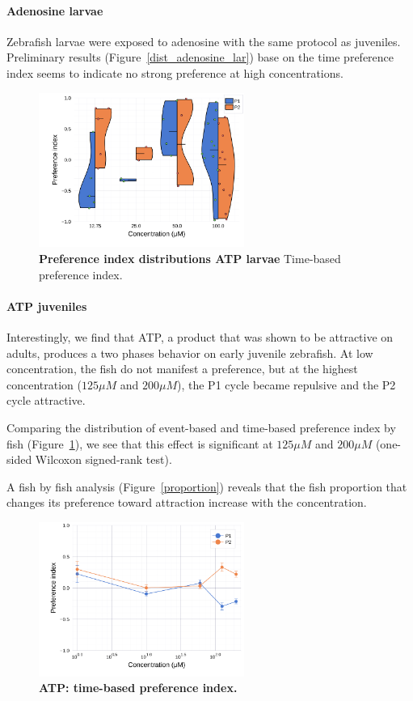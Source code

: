     \paragraph{Adenosine larvae} Zebrafish larvae were exposed to adenosine with the same protocol as juveniles. Preliminary results (Figure~\ref{dist_adenosine_lar}) base on the time preference index seems to indicate no strong preference at high concentrations.

  \begin{figure}[h]
      \centering
      \includegraphics[width=0.6\textwidth]{part_2/assets/dist_adenosine_lar.png}
      \caption{\textbf{Preference index distributions ATP larvae} Time-based preference index. }
      \label{dist_atp}
    \end{figure}

  \paragraph{ATP juveniles} Interestingly, we find that ATP, a product that was shown to be attractive on adults, produces a two phases behavior on early juvenile zebrafish. At low concentration, the fish do not manifest a preference, but at the highest concentration ($125 \mu  M$  and $200 \mu M$), the P1 cycle became repulsive and the P2 cycle attractive.

  Comparing the distribution of event-based and time-based preference index by fish (Figure~\ref{dist_atp}), we see that this effect is significant at $125 \mu M$ and  $200 \mu M$ (one-sided Wilcoxon signed-rank test).

  A fish by fish analysis (Figure~\ref{proportion}) reveals that the fish proportion that changes its preference toward attraction increase with the concentration.

    \begin{figure}[h]
      \centering
      \includegraphics[width=0.6\textwidth]{part_2/assets/atp.png}
      \caption{\textbf{ATP: time-based preference index.} }
      \label{atp}
    \end{figure}

